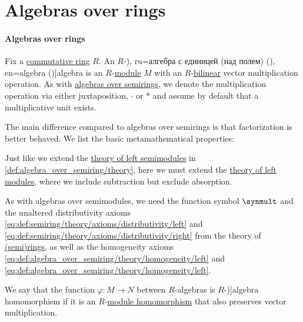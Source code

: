 \section{Algebras over rings}\label{sec:algebras_over_rings}

\paragraph{Algebras over rings}

\begin{definition}\label{def:algebra_over_ring}\mimprovised
  Fix a \hyperref[def:ring/commutative]{commutative ring} \( R \). An \( R \)-\term[bg=линейна асоциативна алгебра (над поле) (\cite[298]{ГеновМиховскиМоллов1991Алгебра}), ru=алгебра с единицей (над полем) (\cite[def. 1.7.1]{Винберг2014КурсАлгебры}), en=algebra (\cite[def. 3.1.1]{Bourbaki1998Algebra1to3})]{algebra} is an \( R \)-\hyperref[def:module]{module} \( M \) with an \( R \)-\hyperref[def:multilinear_function]{bilinear} vector multiplication operation. As with \hyperref[def:algebra_over_semiring]{algebras over semirings}, we denote the multiplication operation via either juxtaposition, \( {\cdot} \) or \( {\ast} \) and assume by default that a multiplicative unit exists.

  The main difference compared to algebras over semirings is that factorization is better behaved. We list the basic metamathematical properties:
  \begin{thmenum}[resume=def:algebra_over_ring]
    \mimprovised Just like we extend the \hyperref[def:semimodule/theory]{theory of left semimodules} in \cref{def:algebra_over_semiring/theory}, here we must extend the \hyperref[def:semimodule/theory]{theory of left modules}, where we include subtraction but exclude absorption.

    As with algebras over semimodules, we need the function symbol \( {\synmult} \) and the unaltered distributivity axioms \eqref{eq:def:semiring/theory/axioms/distributivity/left} and \eqref{eq:def:semiring/theory/axioms/distributivity/right} from the theory of \hyperref[def:semiring/theory]{(semi)rings}, as well as the homogeneity axioms \eqref{eq:def:algebra_over_semiring/theory/homogeneity/left} and \eqref{eq:def:algebra_over_semiring/theory/homogeneity/left}.

     We say that the function \( \varphi: M \to N \) between \( R \)-algebras is \( R \)-\term[en=homomorphism (\cite[def. 3.1.2]{Bourbaki1998Algebra1to3})]{algebra homomorphism} if it is an \( R \)-\hyperref[def:module/morphism]{module homomorphism} that also preserves vector multiplication.


\end{thmenum}
\end{definition}
